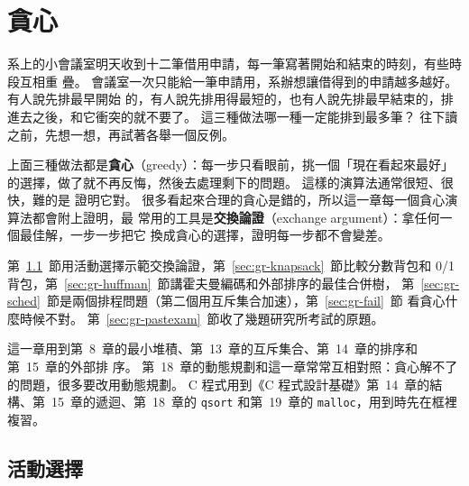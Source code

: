 \chapter{貪心}
\label{ch:greedy}


系上的小會議室明天收到十二筆借用申請，每一筆寫著開始和結束的時刻，有些時段互相重
疊。 會議室一次只能給一筆申請用，系辦想讓借得到的申請越多越好。 有人說先排最早開始
的，有人說先排用得最短的，也有人說先排最早結束的，排進去之後，和它衝突的就不要了。
這三種做法哪一種一定能排到最多筆？ 往下讀之前，先想一想，再試著各舉一個反例。

上面三種做法都是\textbf{貪心}（greedy）：每一步只看眼前，挑一個「現在看起來最好」
的選擇，做了就不再反悔，然後去處理剩下的問題。 這樣的演算法通常很短、很快，難的是
證明它對。 很多看起來合理的貪心是錯的，所以這一章每一個貪心演算法都會附上證明，最
常用的工具是\textbf{交換論證}（exchange argument）：拿任何一個最佳解，一步一步把它
換成貪心的選擇，證明每一步都不會變差。

第~\ref{sec:gr-activity}~節用活動選擇示範交換論證，第~\ref{sec:gr-knapsack}~節比較分數背包和
0/1 背包，第~\ref{sec:gr-huffman}~節講霍夫曼編碼和外部排序的最佳合併樹，
第~\ref{sec:gr-sched}~節是兩個排程問題（第二個用互斥集合加速），第~\ref{sec:gr-fail}~節
看貪心什麼時候不對。 第~\ref{sec:gr-pastexam}~節收了幾題研究所考試的原題。

這一章用到第~8~章的最小堆積、第~13~章的互斥集合、第~14~章的排序和第~15~章的外部排
序。 第~18~章的動態規劃和這一章常常互相對照：貪心解不了的問題，很多要改用動態規劃。
C 程式用到《C 程式設計基礎》第~14~章的結構、第~15~章的遞迴、第~18~章的
\texttt{qsort} 和第~19~章的 \texttt{malloc}，用到時先在框裡複習。

\section{活動選擇}
\label{sec:gr-activity}

